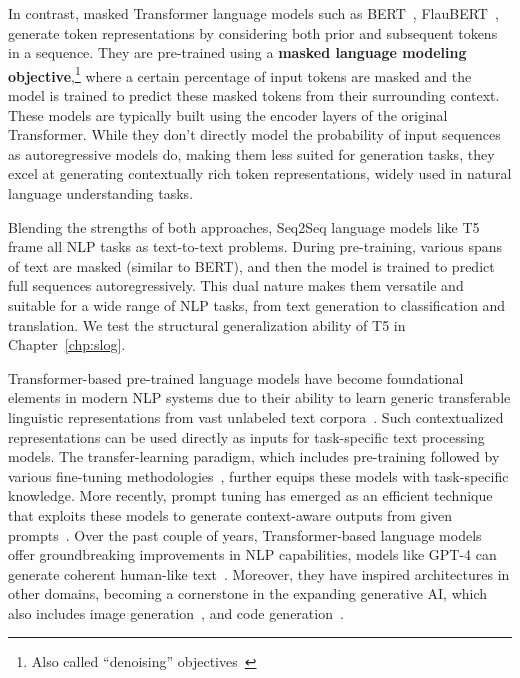 In contrast, masked Transformer language models such as \ac{BERT}~\citep{devlin-etal-2019-bert}, FlauBERT~\citep{le2019flaubert}, generate token representations by considering both prior and subsequent tokens in a sequence. They are pre-trained using a \textbf{masked language modeling objective},\footnote{Also called ``denoising'' objectives~\citep{taylor1953cloze}} where a certain percentage of input tokens are masked and the model is trained to predict these masked tokens from their surrounding context. These models are typically built using the encoder layers of the original Transformer. While they don't directly model the probability of input sequences as autoregressive models do, making them less suited for generation tasks, they excel at generating contextually rich token representations, widely used in natural language understanding tasks. 

Blending the strengths of both approaches, Seq2Seq language models like T5~\citep{2020t5} frame all NLP tasks as text-to-text problems. During pre-training, various spans of text are masked (similar to BERT), and then the model is trained to predict full sequences autoregressively. This dual nature makes them versatile and suitable for a wide range of NLP tasks, from text generation to classification and translation. We test the structural generalization ability of T5 in Chapter~\ref{chp:slog}.

Transformer-based pre-trained language models have become foundational elements in modern NLP systems due to their ability to learn generic transferable linguistic representations from vast unlabeled text corpora~\citep{kalyan2021ammus}. %
Such contextualized representations can be used directly as inputs for task-specific text processing models. The transfer-learning paradigm, which includes pre-training followed by various fine-tuning methodologies~\citep{devlin-etal-2019-bert,pruksachatkun2020intermediate,liu2019multi}, further equips these models with task-specific knowledge. More recently, prompt tuning has emerged as an efficient technique that exploits these models to generate context-aware outputs from given prompts~\citep{liu2021pretrain}. Over the past couple of years, Transformer-based language models offer groundbreaking improvements in NLP capabilities, models like GPT-4 can generate coherent human-like text~\citep{bubeck2023sparks}. Moreover, they have inspired architectures in other domains, becoming a cornerstone in the expanding generative AI, which also includes image generation~\citep{ramesh2022hierarchical}, and code generation~\citep{chen2021evaluating}.

